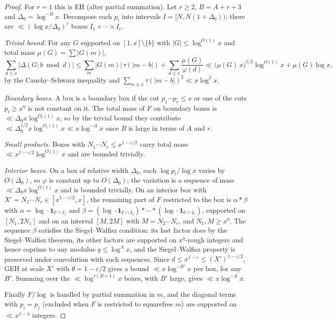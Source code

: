 \documentclass[11pt]{amsart}
\theoremstyle{definition}
\theoremstyle{remark}
\newcommand{\PP}{\mathbb{P}}
\begin{document}
\begin{proof}
For $r=1$ this is EH (after partial summation). Let $r\ge2$, $B=A+r+3$ and $\Delta_0=\log^{-B}x$. Decompose each $p_i$ into intervals $I=[N,N(1+\Delta_0))$; there are $\ll(\log x/\Delta_0)^r$ boxes $I_1\times\cdots\times I_r$.

\emph{Trivial bound.} For any $G$ supported on $[1,x]\setminus\{b\}$ with $|G|\le\log^{O(1)}x$ and total mass $\mu(G)=\sum|G(m)|$,
\[
\sum_{d\le x}|\Delta(G;b\bmod d)|\le\sum_m|G(m)|\,\tau(|m-b|)+\sum_{d\le x}\frac{\mu(G)}{\varphi(d)}\ll\bigl(\mu(G)\,x\bigr)^{1/2}\log^{O(1)}x+\mu(G)\log x,
\]
by the Cauchy--Schwarz inequality and $\sum_{m\le x}\tau(|m-b|)^2\ll x\log^3x$.

\emph{Boundary boxes.} A box is a boundary box if the cut $p_1\cdots p_r\le x$ or one of the cuts $p_i\ge x^\eta$ is not constant on it. The total mass of $F$ on boundary boxes is $\ll\Delta_0x\log^{O_r(1)}x$, so by the trivial bound they contribute $\ll\Delta_0^{1/2}x\log^{O_r(1)}x\ll x\log^{-A}x$ once $B$ is large in terms of $A$ and $r$.

\emph{Small products.} Boxes with $N_1\cdots N_r\le x^{1-\varepsilon/2}$ carry total mass $\ll x^{1-\varepsilon/2}\log^{O(1)}x$ and are bounded trivially.

\emph{Interior boxes.} On a box of relative width $\Delta_0$, each $\log p_i/\log x$ varies by $O(\Delta_0)$, so $\varphi$ is constant up to $O(\Delta_0)$; the variation is a sequence of mass $\ll\Delta_0x\log^{O(1)}x$ and is bounded trivially. On an interior box with $X'=N_1\cdots N_r\in[x^{1-\varepsilon/2},x]$, the remaining part of $F$ restricted to the box is $\alpha*\beta$ with $\alpha=\log\cdot\mathbf 1_{\PP\cap I_1}$ and $\beta=(\log\cdot\mathbf 1_{\PP\cap I_2})*\cdots*(\log\cdot\mathbf 1_{\PP\cap I_r})$, supported on $[N_1,2N_1]$ and on an interval $[M,2M]$ with $M=N_2\cdots N_r$, and $N_1,M\ge x^\eta$. The sequence $\beta$ satisfies the Siegel--Walfisz condition: its last factor does by the Siegel--Walfisz theorem, its other factors are supported on $x^\eta$-rough integers and hence coprime to any modulus $q\le\log^{A}x$, and the Siegel--Walfisz property is preserved under convolution with such sequences. Since $d\le x^{1-\varepsilon}\le(X')^{1-\varepsilon/2}$, GEH at scale $X'$ with $\theta=1-\varepsilon/2$ gives a bound $\ll x\log^{-B'}x$ per box, for any $B'$. Summing over the $\ll\log^{r(B+1)}x$ boxes, with $B'$ large, gives $\ll x\log^{-A}x$.

Finally $F/\log$ is handled by partial summation in $m$, and the diagonal terms with $p_i=p_j$ (excluded when $F$ is restricted to squarefree $m$) are supported on $\ll x^{1-\eta}$ integers.
\end{proof}
\end{document}
